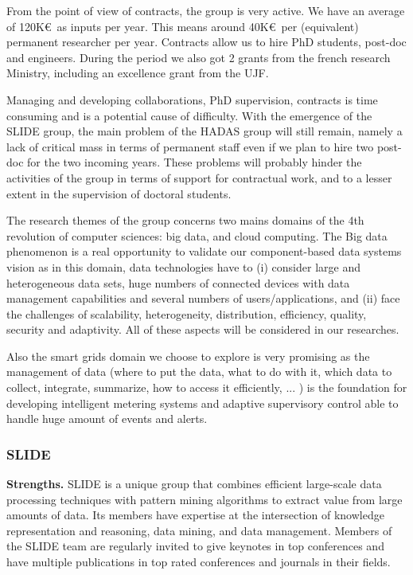 From the point of view of contracts, the group is very active. We have an average of 120K\euro\ as inputs per year. This means around 40K\euro\ per (equivalent) permanent researcher per year. Contracts allow us to hire PhD students, post-doc and engineers. During the period we also got 2 grants from the french research Ministry, including an excellence grant from the UJF. 


Managing and developing collaborations, PhD supervision, contracts is time consuming and is a potential cause of difficulty. 
With the emergence of the SLIDE group, the main problem of the HADAS group will still remain, namely a lack of critical mass in terms of permanent staff even if we plan to hire two post-doc for the two incoming years.  These problems will probably hinder the activities of the group in terms of support for contractual work, and to a lesser extent in the supervision of doctoral students.


The research themes of the group concerns two mains domains of the 4th revolution of computer sciences:  big data, and  cloud computing. The Big data phenomenon is a real opportunity to validate our component-based data systems vision as in this domain, data technologies have to (i) consider large and heterogeneous data sets, huge numbers of connected devices with data management capabilities and several numbers of users/applications,  and (ii) face the challenges of scalability,  heterogeneity, distribution, efficiency, quality, security and adaptivity. All of these aspects will be considered  in our researches. 

Also the  smart grids domain we choose to explore is very promising as the management of data (where to put the data, what to do with it, which data to collect,  integrate, summarize, how to access it efficiently, ... ) is the foundation for developing intelligent metering systems and adaptive supervisory control able to handle huge amount of events and alerts.  


\subsubsection*{SLIDE}

{\bf Strengths.}
SLIDE is a unique group that combines efficient large-scale data
processing techniques with pattern mining algorithms to extract value
from large amounts of data. Its members have expertise at the
intersection of knowledge representation and reasoning, data mining,
and data management. Members of the SLIDE team are regularly invited
to give keynotes in top conferences and have multiple publications in
top rated conferences and journals in their fields.

